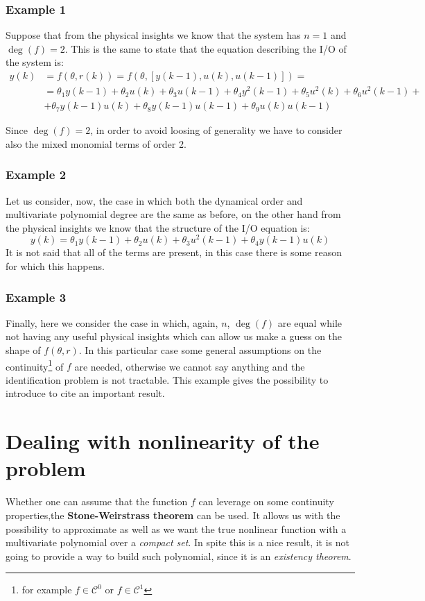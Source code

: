 \subsubsection{Example 1}
Suppose that from the physical insights we know that the system has $n=1$ and $\deg(f)=2$. This is the same to state that the equation describing the I/O of the system is:
\begin{align}
    y(k)&=f(\theta,r(k))=f(\theta,[y(k-1),u(k),u(k-1)])=\\
    &=\theta_1y(k-1)+\theta_2 u(k) + \theta_3 u(k-1) 
    + \theta_4 y^2(k-1)+\theta_5 u^2(k)+\theta_6 u^2(k-1)+\\
    &+\theta_7{y(k-1)u(k)}+\theta_8{y(k-1)u(k-1)}+\theta_9{u(k)u(k-1)}
\end{align}

Since $\deg(f)=2$, in order to avoid loosing of generality we have to consider also the mixed monomial terms of order 2.

\subsubsection{Example 2}
Let us consider, now, the case in which both the dynamical order and multivariate polynomial degree are the same as before, on the other hand from the physical insights we know that the structure of the I/O equation is:
\begin{equation*}
    y(k)=\theta_1y(k-1) + \theta_2 u(k) +\theta_3 u^2(k-1)+\theta_4{y(k-1)u(k)}
\end{equation*}
It is not said that all of the terms are present, in this case there is some reason for which this happens.

\subsubsection{Example 3}
Finally, here we consider the case in which, again, $n$, $\deg(f)$ are equal while not having any useful physical insights which can allow us make a guess on the shape of $f(\theta,r)$.
In this particular case some general assumptions on the continuity\footnote{
    for example $f\in\mathcal{C}^0$ or $f\in\mathcal{C}^1$
} of $f$ are needed, otherwise we cannot say anything and the identification problem is not tractable. This example gives the possibility to introduce to cite an important result.

\section{Dealing with nonlinearity of the problem}
Whether one can assume that the function $f$ can leverage on some continuity properties,the \textbf{Stone-Weirstrass theorem} can be used. It allows us with the possibility to approximate as well as we want the true nonlinear function with a multivariate polynomial over a \textit{compact set}. In spite this is a nice result, it is not going to provide a way to build such polynomial, since it is an \textit{existency theorem}.

